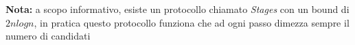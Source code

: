 \begin{footnotesize}
\textbf{Nota: }
a scopo informativo, esiste un protocollo chiamato \emph{Stages} con un bound di $2n log n$, in pratica questo protocollo funziona che ad ogni passo dimezza sempre il numero di candidati
\end{footnotesize}

